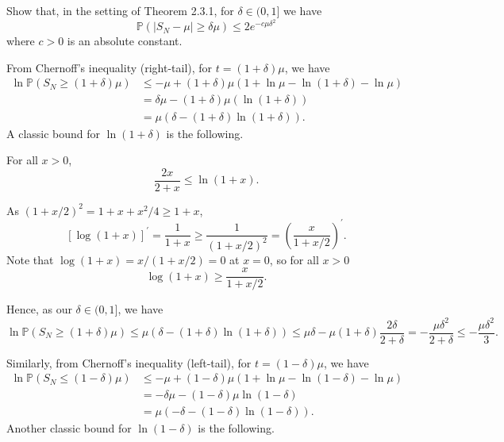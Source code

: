 \begin{problem*}[Exercise 2.3.5]\label{ex2.3.5}
	Show that, in the setting of Theorem 2.3.1, for \(\delta \in (0, 1]\) we have
	\[
		\mathbb{P} (\lvert S_N - \mu \rvert \geq \delta \mu )
		\leq 2 e^{- c \mu \delta ^2}
	\]
	where \(c > 0\) is an absolute constant.
\end{problem*}
\begin{answer}
	From Chernoff's inequality (right-tail), for \(t = (1 + \delta ) \mu \), we have
	\[
		\begin{split}
			\ln \mathbb{P} (S_N \geq (1 + \delta )\mu )
			 & \leq -\mu + (1+\delta )\mu \left( 1 + \ln \mu - \ln (1 + \delta ) - \ln \mu \right) \\
			 & = \delta \mu - (1+\delta )\mu (\ln (1 + \delta ))                                   \\
			 & = \mu (\delta - (1+\delta ) \ln (1+\delta )).
		\end{split}
	\]
	A classic bound for \(\ln (1 + \delta )\) is the following.

	\begin{claim}
		For all \(x > 0\),
		\[
			\frac{2x }{2 + x } \leq \ln (1+x ).
		\]
	\end{claim}
	\begin{explanation}
		As \((1+x/2)^{2}=1+x+x^{2}/4\geq1+x\),
		\[
			[ \log(1+x) ]^{\prime}
			= \frac{1}{1 + x}
			\geq \frac{1}{(1 + x / 2)^{2}}
			=\left(\frac{x}{1 + x / 2}\right)^{\prime} .
		\]
		Note that \(\log(1+x) = x / (1 + x / 2) = 0\) at \(x=0\), so for all \(x > 0\)
		\[
			\log(1+x) \geq \frac{x}{1 + x / 2}.
		\]
	\end{explanation}

	Hence, as our \(\delta \in (0, 1]\), we have
	\[
		\ln \mathbb{P} (S_N \geq (1+\delta ) \mu )
		\leq \mu (\delta - (1+\delta ) \ln (1+\delta ))
		\leq \mu \delta - \mu (1+\delta ) \frac{2\delta }{2 + \delta }
		= - \frac{\mu \delta ^2}{2 + \delta }
		\leq - \frac{\mu \delta ^2}{3}.
	\]

	Similarly, from Chernoff's inequality (left-tail), for \(t = (1 - \delta ) \mu \), we have
	\[
		\begin{split}
			\ln \mathbb{P} (S_N \leq (1-\delta )\mu )
			 & \leq -\mu + (1-\delta )\mu (1 + \ln \mu - \ln (1-\delta ) - \ln \mu ) \\
			 & = -\delta \mu - (1-\delta )\mu \ln (1-\delta )                        \\
			 & = \mu (-\delta - (1-\delta ) \ln (1-\delta )).
		\end{split}
	\]
	Another classic bound for \(\ln (1 - \delta )\) is the following.


\end{answer}
